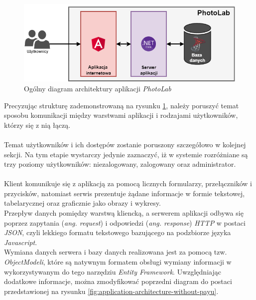 	\begin{figure}[ht]
	\centering
	\includegraphics[width=1\linewidth]{graphics/chapter-4/general-application-architecture.png}
	\caption{Ogólny diagram architektury aplikacji \textit{PhotoLab}}
	\label{fig:general-application-architecture}
\end{figure}
\noindent Precyzując strukturę zademonstrowaną na rysunku \ref{fig:general-application-architecture}, należy poruszyć temat sposobu komunikacji między warstwami aplikacji i rodzajami użytkowników, którzy się z nią łączą.\\
	\\
	Temat użytkowników i ich dostępów zostanie poruszony szczegółowo w kolejnej sekcji. Na tym etapie wystarczy jedynie zaznaczyć, iż w systemie rozróżniane są trzy poziomy użytkowników: niezalogowany, zalogowany oraz administrator.\\
	\\
	Klient komunikuje się z aplikacją za pomocą licznych formularzy, przełączników i przycisków, natomiast serwis prezentuje żądane informacje w formie tekstowej, tabelarycznej oraz graficznie jako obrazy i wykresy.\\
	Przepływ danych pomiędzy warstwą kliencką, a serwerem aplikacji odbywa się poprzez zapytania (\textit{ang. request}) i odpowiedzi (\textit{ang. response}) \textit{HTTP} w postaci \textit{JSON}, czyli lekkiego formatu tekstowego bazującego na podzbiorze języka \textit{Javascript}.\\
	Wymiana danych serwera i bazy danych realizowana jest za pomocą tzw. \textit{ObjectModeli}, które są natywnym formatem obsługi wymiany informacji w  wykorzystywanym do tego narzędziu \textit{Entity Framework}. Uwzględniając dodatkowe informacje, można zmodyfikować poprzedni diagram do postaci przedstawionej na rysunku \ref{fig:application-architecture-without-payu}.
	
	
	
